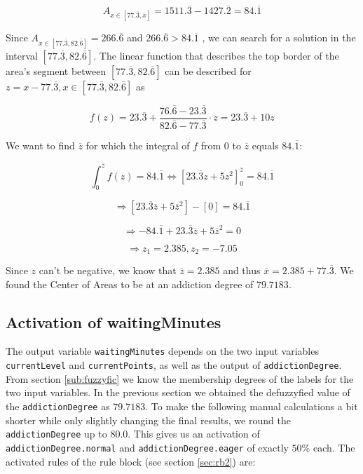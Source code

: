 \[ A_{x \in [77.\overline{3},\overline{x}]} = 1511.\overline{3} - 1427.\overline{2} = 84.\overline{1} \]

Since $ A_{x \in [77.\overline{3},82.\overline{6}]} = 266.\overline{6} $ and $266.\overline{6} > 84.\overline{1}$ , we can search for a solution in the interval $[77.\overline{3},82.\overline{6}]$. The linear function that describes the top border of the area's segment between $[77.\overline{3},82.\overline{6}]$ can be described for $z = x -77.\overline{3}, x \in [77.\overline{3},82.\overline{6}] $ as

\[ f(z) = 23.\overline{3} + \frac{76.\overline{6} -23.\overline{3} }{82.\overline{6}-77.\overline{3}} \cdot z = 23.\overline{3} + 10z\]

We want to find $\overline{z}$ for which the integral of $f$ from 0 to $\overline{z}$ equals $84.\overline{1}$:

\[ \int_0^{\overline{z}} f(z) = 84.\overline{1} \Leftrightarrow [23.\overline{3}z + 5z^2]_0^{\overline{z}} = 84.\overline{1} \]

\[ \Rightarrow [23.\overline{3}\overline{z} + 5\overline{z}^2] - [0] = 84.\overline{1}\]

\[ \Rightarrow - 84.\overline{1} + 23.\overline{3}\overline{z} + 5\overline{z}^2  = 0\]

\[ \Rightarrow z_1 = 2.385, z_2 = -7.05 \]

Since $z$ can't be negative, we know that $\overline{z} = 2.385 $ and thus $\overline{x} = 2.385 + 77.\overline{3} $. We found the Center of Areas to be at an addiction degree of $79.7183$.

\subsection{Activation of waitingMinutes}

The output variable \texttt{waitingMinutes} depends on the two input variables \texttt{currentLevel} and \texttt{currentPoints}, as well as the output of \texttt{addictionDegree}. From section \ref{sub:fuzzyfic} we know the membership degrees of the labels for the two input variables. In the previous section we obtained the defuzzyfied value of the \texttt{addictionDegree} as $79.7183$. To make the following manual calculations a bit shorter while only slightly changing the final results, we round the \texttt{addictionDegree} up to $80.0$. This gives us an activation of \texttt{addictionDegree.normal} and \texttt{addictionDegree.eager} of exactly $50\%$ each. The activated rules of the rule block (see section \ref{sec:rb2}) are:

